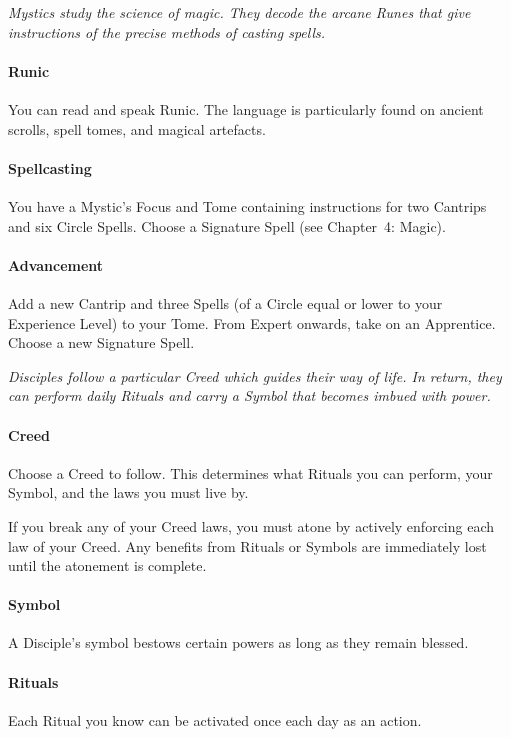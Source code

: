 \documentclass[itdr]{subfiles}
\begin{document}
\vfill

{\em Mystics study the science of magic. They decode the arcane Runes that give instructions of the precise methods of casting spells.}

\paragraph{Runic}
You can read and speak Runic. The language is particularly found on ancient scrolls, spell tomes, and magical artefacts.

\paragraph{Spellcasting}
You have a Mystic's Focus and Tome containing instructions for two Cantrips and six  Circle Spells. Choose a Signature Spell (see Chapter~4: Magic).

\paragraph{Advancement}
Add a new Cantrip and three Spells (of a Circle equal or lower to your Experience Level) to your Tome. From Expert onwards, take on an Apprentice. Choose a new Signature Spell.

\break

{\em Disciples follow a particular Creed which guides their way of life. In return, they can perform daily Rituals and carry a Symbol that becomes imbued with power.}

\paragraph{Creed}
Choose a Creed to follow. This determines what Rituals you can perform, your Symbol, and the laws you must live by.

If you break any of your Creed laws, you must atone by actively enforcing each law of your Creed. Any benefits from Rituals or Symbols are immediately lost until the atonement is complete.

\paragraph{Symbol}
A Disciple's symbol bestows certain powers as long as they remain blessed.

\paragraph{Rituals}
Each Ritual you know can be activated once each day as an action.
\end{document}
